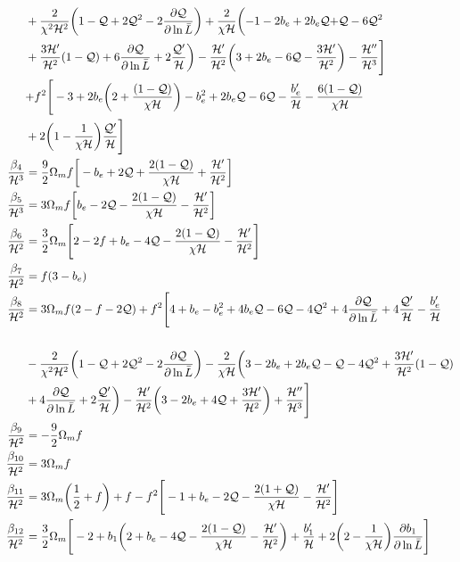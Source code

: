 \begin{align}
& +\frac{2}{\chi^{2}\cH^{2}}\bigg(1-\Q+2\Q^{2}-2\frac{\p \Q}{\p \ln{\bar{L}}}\bigg) + \frac{2}{\chi \cH}\bigg({-1} -2b_{e}+2b_{e}\Q{+}\Q-6\Q^{2}  \nonumber \\
& +\frac{3\cH'}{\cH^{2}}(1-\Q) +6\frac{\p \Q}{\p \ln{\bar{L}}} + 2\frac{\Q'}{\cH}\bigg) -\frac{\cH'}{\cH^{2}}\bigg({3}+2b_{e}-6\Q-\frac{3\cH'}{\cH^{2}}\bigg) - \frac{\cH''}{\cH^{3}}\Bigg] \nonumber \\
&  {+} f^{2}\Bigg[-3+2b_{e}\bigg(2+\frac{(1-\Q)}{\chi\cH}\bigg)-b_{e}^{2}+2b_{e}\Q -6\Q-\frac{b_{e}'}{\cH}-\frac{6(1-\Q)}{\chi\cH}\nonumber \\
& +2\bigg(1-\frac{1}{\chi\cH}\bigg)\frac{\Q'}{\cH}\Bigg]  \\ 
\frac{\beta_{4}}{\cH^{3}} &= \frac{9}{2}\Omega_{m}f\bigg[-b_{e}+2\Q+\frac{2(1-\Q)}{\chi \cH}+\frac{\cH'}{\cH^{2}}\bigg]\\ 
{{\frac{\beta_5}{\cH^{3}}}} &= 3\Omega_{m}f\bigg[b_{e}-2\Q-\frac{2(1-\Q)}{\chi\cH}-\frac{\cH'}{\cH^{2}}\bigg] \\ 
\frac{\beta_6}{\cH^{2}} &= \frac{3}{2}\Omega_{m}\Bigg[2-2f+b_{e}-4\Q-\frac{2(1-\Q)}{\chi\cH}-\frac{\cH'}{\cH^{2}}\Bigg] \\
\frac{\beta_7}{\cH^{2}} &= f(3-b_{e}) \\ 
\frac{\beta_8}{\cH^{2}} &= {3\Omega_{m}f(2-f-2\Q)} + f^{2}\Bigg[4+b_{e}-b_{e}^{2}+4b_{e}\Q-{6}\Q-4\Q^{2}+4\frac{\p \Q}{\p \ln{\bar{L}}} + 4\frac{\Q'}{\cH} - \frac{b_{e}'}{\cH}  \nonumber \\\nonumber\\
& - \frac{2}{\chi^{2}\cH^{2}}\bigg(1-\Q+2\Q^{2}-2\frac{\p \Q}{\p \ln{\bar{L}}}\bigg) - \frac{2}{\chi\cH}\bigg(3-2b_{e}+2b_{e}\Q-\Q-4\Q^{2}+\frac{3\cH'}{\cH^{2}}(1-\Q) \nonumber\\
& + 4\frac{\p \Q}{\p \ln{\bar{L}}} + 2\frac{\Q'}{\cH}\bigg) - \frac{\cH'}{\cH^{2}}\bigg(3-2b_{e}+{4}\Q+\frac{3\cH'}{\cH^{2}}\bigg) + \frac{\cH''}{\cH^{3}}\Bigg] \\ 
\frac{\beta_{9}}{\cH^{2}} &= -\frac{9}{2}\Omega_{m}f \\ 
{\frac{\beta_{10}}{\cH^{2}}} &= 3\Omega_{m}f \\ 
\frac{\beta_{11}}{\cH^{2}} &= 3\Omega_{m}\bigg(\frac{1}{2}+f\bigg) + f - f^{2}\Bigg[-1+b_{e}-2\Q- \frac{2(1+\Q)}{\chi\cH}-\frac{\cH'}{\cH^{2}}\Bigg] \\ 
\frac{\beta_{12}}{\cH^{2}} &= \frac{3}{2}\Omega_{m}\Bigg[-2+b_{1}\bigg(2+b_{e}-4\Q-\frac{2(1-\Q)}{\chi\cH} -\frac{\cH'}{\cH^{2}}\bigg) + \frac{b_{1}'}{\cH} + 2\bigg(2-\frac{1}{\chi\cH}\bigg)\frac{\p b_{1}}{\p \ln{\bar{L}}}\Bigg] \nonumber \\

\end{align}
